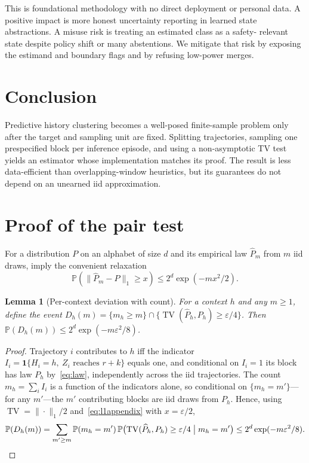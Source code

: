 \documentclass{article}
\newtheorem{lemma}[theorem]{Lemma}
\newcommand{\Prb}{\mathbb P}
\newcommand{\eps}{\varepsilon}
\DeclareMathOperator{\TV}{TV}
\begin{document}
This is foundational methodology with no direct deployment or personal data.
A positive impact is more honest uncertainty reporting in learned state
abstractions.  A misuse risk is treating an estimated class as a safety-
relevant state despite policy shift or many abstentions.  We mitigate that
risk by exposing the estimand and boundary flags and by refusing low-power
merges.

\section{Conclusion}

Predictive history clustering becomes a well-posed finite-sample problem only
after the target and sampling unit are fixed.  Splitting trajectories,
sampling one prespecified block per inference episode, and using a
non-asymptotic TV test yields an estimator whose implementation matches its
proof.  The result is less data-efficient than overlapping-window heuristics,
but its guarantees do not depend on an unearned iid approximation.

\clearpage



\appendix
\section{Proof of the pair test}                       \label{app:pair}

For a distribution $P$ on an alphabet of size $d$ and its empirical law
$\widehat P_m$ from $m$ iid draws, \citet[Theorem~2.1]{weissman2003l1} imply
the convenient relaxation
\begin{equation}
 \Prb(\|\widehat P_m-P\|_1\ge x)
 \le 2^d\exp(-mx^2/2).                                \label{eq:l1appendix}
\end{equation}

\begin{lemma}[Per-context deviation with count]          \label{lem:onecount}
For a context $h$ and any $m\ge1$, define the event
$D_h(m)=\{m_h\ge m\}\cap\{\TV(\widehat P_h,P_h)\ge\eps/4\}$.  Then
$\Prb(D_h(m))\le 2^d\exp(-m\eps^2/8)$.
\end{lemma}

\begin{proof}
Trajectory $i$ contributes to $h$ iff the indicator
$I_i=\mathbf 1\{H_i=h,\ Z_i\text{ reaches }r+k\}$ equals one, and
conditional on $I_i=1$ its block has law $P_h$ by~\eqref{eq:law},
independently across the iid trajectories.  The count
$m_h=\sum_i I_i$ is a function of the indicators alone, so conditional on
$\{m_h=m'\}$---for any $m'$---the $m'$ contributing blocks are iid draws
from $P_h$.  Hence, using $\TV=\|\cdot\|_1/2$
and~\eqref{eq:l1appendix} with $x=\eps/2$,
\[
\Prb(D_h(m))
=\sum_{m'\ge m}\Prb(m_h=m')\,
 \Prb\bigl(\TV(\widehat P_h,P_h)\ge\eps/4\bigm|m_h=m'\bigr)
\le 2^d\exp(-m\eps^2/8).                                \qedhere
\]
\end{proof}
\end{document}
